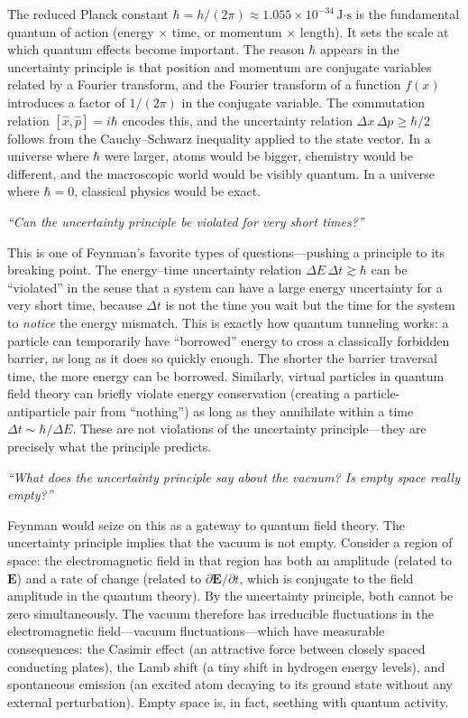 \documentclass[11pt,openright]{book}
\begin{document}
The reduced Planck constant $\hbar = h/(2\pi) \approx 1.055 \times 10^{-34}\,\text{J·s}$ is the fundamental quantum of action (energy $\times$ time, or momentum $\times$ length). It sets the scale at which quantum effects become important. The reason $\hbar$ appears in the uncertainty principle is that position and momentum are conjugate variables related by a Fourier transform, and the Fourier transform of a function $f(x)$ introduces a factor of $1/(2\pi)$ in the conjugate variable. The commutation relation $[\hat{x},\hat{p}] = i\hbar$ encodes this, and the uncertainty relation $\Delta x\,\Delta p \geq \hbar/2$ follows from the Cauchy--Schwarz inequality applied to the state vector. In a universe where $\hbar$ were larger, atoms would be bigger, chemistry would be different, and the macroscopic world would be visibly quantum. In a universe where $\hbar = 0$, classical physics would be exact.

\textit{``Can the uncertainty principle be violated for very short times?''}

This is one of Feynman's favorite types of questions---pushing a principle to its breaking point. The energy--time uncertainty relation $\Delta E\,\Delta t \gtrsim \hbar$ can be ``violated'' in the sense that a system can have a large energy uncertainty for a very short time, because $\Delta t$ is not the time you wait but the time for the system to \emph{notice} the energy mismatch. This is exactly how quantum tunneling works: a particle can temporarily have ``borrowed'' energy to cross a classically forbidden barrier, as long as it does so quickly enough. The shorter the barrier traversal time, the more energy can be borrowed. Similarly, virtual particles in quantum field theory can briefly violate energy conservation (creating a particle-antiparticle pair from ``nothing'') as long as they annihilate within a time $\Delta t \sim \hbar/\Delta E$. These are not violations of the uncertainty principle---they are precisely what the principle predicts.

\textit{``What does the uncertainty principle say about the vacuum? Is empty space really empty?''}

Feynman would seize on this as a gateway to quantum field theory. The uncertainty principle implies that the vacuum is not empty. Consider a region of space: the electromagnetic field in that region has both an amplitude (related to $\mathbf{E}$) and a rate of change (related to $\partial\mathbf{E}/\partial t$, which is conjugate to the field amplitude in the quantum theory). By the uncertainty principle, both cannot be zero simultaneously. The vacuum therefore has irreducible fluctuations in the electromagnetic field---vacuum fluctuations---which have measurable consequences: the Casimir effect (an attractive force between closely spaced conducting plates), the Lamb shift (a tiny shift in hydrogen energy levels), and spontaneous emission (an excited atom decaying to its ground state without any external perturbation). Empty space is, in fact, seething with quantum activity.
\end{document}
